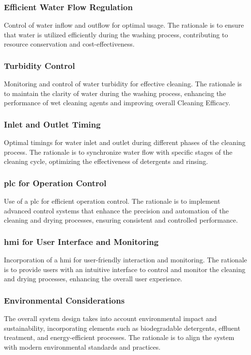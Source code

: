 \documentclass[12pt]{article} %
\begin{document}
 \subsubsection{Efficient Water Flow Regulation} Control of water inflow and outflow for optimal usage. The rationale is to ensure that water is utilized efficiently during the washing process, contributing to resource conservation and cost-effectiveness.
 
 \subsubsection{Turbidity Control} Monitoring and control of water turbidity for effective cleaning. The rationale is to maintain the clarity of water during the washing process, enhancing the performance of \gls{wet cleaning agent}s and improving overall \gls{Cleaning Efficacy}.
 
 \subsubsection{Inlet and Outlet Timing} Optimal timings for water inlet and outlet during different phases of the cleaning process. The rationale is to synchronize water flow with specific stages of the cleaning cycle, optimizing the effectiveness of detergents and rinsing.
 
 \subsubsection{\acrshort{plc} for Operation Control} Use of a \acrlong{plc} for efficient operation control. The rationale is to implement advanced control systems that enhance the precision and automation of the cleaning and drying processes, ensuring consistent and controlled performance.
 
 \subsubsection{\acrshort{hmi} for User Interface and Monitoring} Incorporation of a \acrlong{hmi} for user-friendly interaction and monitoring. The rationale is to provide users with an intuitive interface to control and monitor the cleaning and drying processes, enhancing the overall user experience.
 
 \subsubsection{Environmental Considerations} The overall system design takes into account environmental impact and sustainability, incorporating elements such as biodegradable detergents, \gls{effluent treatment}, and energy-efficient processes. The rationale is to align the system with modern environmental standards and practices.
 
\end{document}
